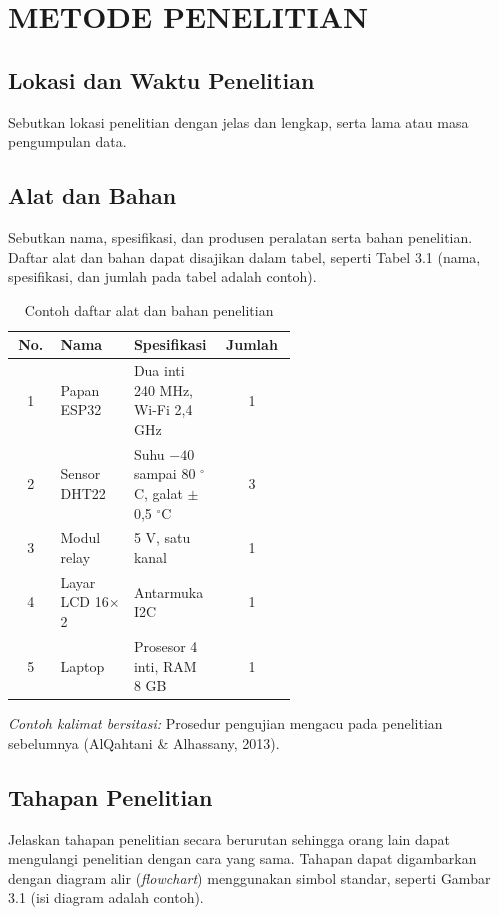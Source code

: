 \chapter{METODE PENELITIAN}

\section{Lokasi dan Waktu Penelitian}
Sebutkan lokasi penelitian dengan jelas dan lengkap, serta lama atau masa pengumpulan data.

\section{Alat dan Bahan}
Sebutkan nama, spesifikasi, dan produsen peralatan serta bahan penelitian. Daftar alat dan bahan dapat disajikan dalam tabel, seperti Tabel 3.1 (nama, spesifikasi, dan jumlah pada tabel adalah contoh).

\begin{singlespace}
\begin{longtable}{|c|p{0.26\linewidth}|p{0.30\linewidth}|c|}
\caption{Contoh daftar alat dan bahan penelitian}\\
\hline
\textbf{No.} & \textbf{Nama} & \textbf{Spesifikasi} & \textbf{Jumlah} \\
\hline
1 & Papan ESP32 & Dua inti 240 MHz, Wi-Fi 2,4 GHz & 1 \\
\hline
2 & Sensor DHT22 & Suhu $-40$ sampai 80 $^\circ$C, galat $\pm$0,5 $^\circ$C & 3 \\
\hline
3 & Modul relay & 5 V, satu kanal & 1 \\
\hline
4 & Layar LCD 16$\times$2 & Antarmuka I2C & 1 \\
\hline
5 & Laptop & Prosesor 4 inti, RAM 8 GB & 1 \\
\hline
\end{longtable}
\end{singlespace}

\textit{Contoh kalimat bersitasi:} Prosedur pengujian mengacu pada penelitian sebelumnya (AlQahtani \& Alhassany, 2013).

\section{Tahapan Penelitian}
Jelaskan tahapan penelitian secara berurutan sehingga orang lain dapat mengulangi penelitian dengan cara yang sama. Tahapan dapat digambarkan dengan diagram alir (\textit{flowchart}) menggunakan simbol standar, seperti Gambar 3.1 (isi diagram adalah contoh).

